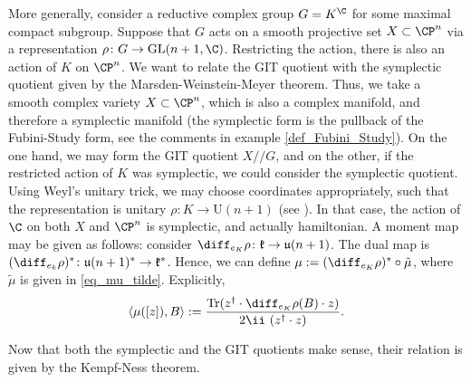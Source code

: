 More generally, consider a reductive complex group \(G=K^\C\) for some maximal compact subgroup. Suppose that $G$ acts on a smooth projective set $X \subset \CP^n$ via a representation $\rho \colon G \to \mathrm{GL}(n+1,\C)$. Restricting the action, there is also an action of \(K\) on \(\CP^n\). We want to relate the GIT quotient with the symplectic quotient given by the Marsden-Weinstein-Meyer theorem. Thus, we take a smooth complex variety \(X \subset \CP^n\), which is also a complex manifold, and therefore a symplectic manifold (the symplectic form is the pullback of the Fubini-Study form, see the comments in example \ref{def_Fubini_Study}). On the one hand, we may form the GIT quotient \(X//G\), and on the other, if the restricted action of \(K\) was symplectic, we could consider the symplectic quotient. Using Weyl's unitary trick, we may choose coordinates appropriately, such that the representation is unitary \(\rho \colon K \to \mathrm{U}(n+1)\) (see ). In that case, the action of \(\C\) on both \(X\) and \(\CP^n\) is symplectic, and actually hamiltonian. A moment map may be given as follows: consider \(\diff_{e_K}\rho\colon \mathfrak{k}\to \mathfrak{u}(n+1)\). The dual map is \((\diff_{e_k}\rho)^*\colon \mathfrak{u}(n+1)^* \to \mathfrak{k}^*\). Hence, we can define \(\mu:=(\diff_{e_K}\rho)^*\circ \tilde{\mu}\), where \(\tilde{\mu}\) is given in \eqref{eq_mu_tilde}. Explicitly,
\[
\langle \mu([z]), B\rangle :=\frac{\mathrm{Tr}(z^\dagger \cdot \diff_{e_K}\rho(B)\cdot z)}{2\ii \ (z^\dagger \cdot z)}.
\]

Now that both the symplectic and the GIT quotients make sense, their relation is given by the Kempf-Ness theorem.

